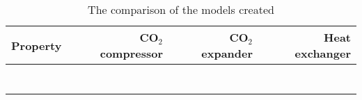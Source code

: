 \begin{table}
\label{tab:DiscussionComparison}
\caption{The comparison of the models created}
\begin{center}
\begin{tabulary}{0.9\textwidth}{LRRR}
\toprule
Property 	&	CO$_2$ compressor & CO$_2$	expander & Heat exchanger \\
\midrule
& & & \\
& & & \\
& & & \\
& & & \\
& & & \\
& & & \\
& & & \\
\bottomrule
\end{tabulary}
\end{center}
\end{table}